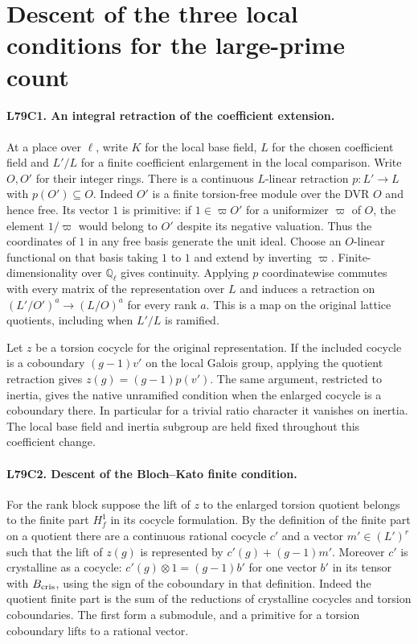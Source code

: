 \section{Descent of the three local conditions for the large-prime count}

\paragraph{L79C1. An integral retraction of the coefficient extension.}
At a place over $\ell$, write $K$ for the local base field, $L$ for
the chosen coefficient field and $L'/L$ for a finite coefficient
enlargement in the local comparison. Write $O,O'$ for their integer
rings. There is a continuous $L$-linear retraction $p:L'\to L$ with
$p(O')\subseteq O$. Indeed $O'$ is a finite torsion-free module over
the DVR $O$ and hence free. Its vector $1$ is primitive: if
$1\in\varpi O'$ for a uniformizer $\varpi$ of $O$, the element $1/\varpi$ would belong to $O'$ despite
its negative valuation. Thus the coordinates of $1$ in any free basis generate
the unit ideal. Choose an $O$-linear functional on that basis taking
$1$ to $1$ and extend by inverting $\varpi$. Finite-dimensionality
over $\mathbb Q_\ell$ gives continuity. Applying $p$ coordinatewise
commutes with every matrix of the representation over $L$ and
induces a retraction on $(L'/O')^a\to(L/O)^a$ for every rank $a$.
This is a map on the original lattice quotients, including when
$L'/L$ is ramified.

Let $z$ be a torsion cocycle for the original representation. If the
included cocycle is a coboundary $(g-1)v'$ on the local Galois
group, applying the quotient retraction gives $z(g)=(g-1)p(v')$.
The same argument, restricted to inertia, gives the native
unramified condition when the enlarged cocycle is a coboundary
there. In particular for a trivial ratio character it vanishes on
inertia. The local base field and inertia subgroup are held fixed
throughout this coefficient change.

\paragraph{L79C2. Descent of the Bloch--Kato finite condition.}
For the rank block suppose the lift of $z$ to the enlarged torsion
quotient belongs to the finite part $H^1_f$ in its cocycle formulation.
By the definition of the finite part on a quotient there are a
continuous rational cocycle $c'$ and a vector $m'\in (L')^r$ such that
the lift of $z(g)$ is represented by
$c'(g)+(g-1)m'$. Moreover $c'$ is crystalline as a cocycle:
$c'(g)\otimes1=(g-1)b'$ for one vector $b'$ in its tensor with
$B_{\rm cris}$, using the sign of the coboundary in that definition.
Indeed the quotient finite part is the sum of the reductions of
crystalline cocycles and torsion coboundaries. The first form a
submodule, and a primitive for a torsion coboundary lifts to a
rational vector.

